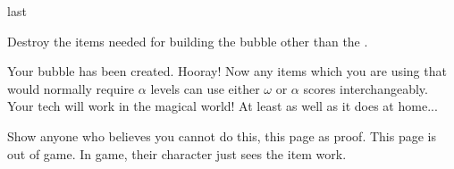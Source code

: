 \documentclass[greennotebook]{guildcamp3} %
\begin{document}
\begin{page}[at last...]{last}

Destroy the items needed for building the bubble other than the \iCauldron{}. 

Your bubble has been created. Hooray! Now any items which you are using that would normally require $\alpha$ levels can use either $\omega$ or $\alpha$ scores interchangeably. Your tech will work in the magical world! At least as well as it does at home... 

Show anyone who believes you cannot do this, this page as proof. This page is out of game. In game, their character just sees the item work. 

\end{page}



\endnotebook
\end{document}
